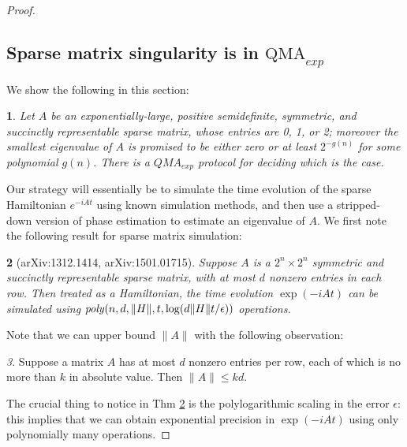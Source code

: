 \documentclass[english]{article}
\numberwithin{equation}{section}
\numberwithin{figure}{section}
\theoremstyle{plain}
\newtheorem{thm}{\protect\theoremname}
\theoremstyle{definition}
\theoremstyle{plain}
\newtheorem{lem}[thm]{\protect\lemmaname}
\theoremstyle{definition}
\theoremstyle{remark}
\newtheorem{rem}[thm]{\protect\remarkname}
\theoremstyle{remark}
\theoremstyle{plain}
\providecommand{\lemmaname}{Lemma}
\providecommand{\remarkname}{Remark}
\providecommand{\theoremname}{Theorem}
\begin{document}
\begin{proof}
\subsection{Sparse matrix singularity is in $\text{QMA}_{exp}$}
We show the following in this section:
\begin{lem}
Let $A$ be an exponentially-large, positive semidefinite, symmetric, and succinctly representable sparse matrix, whose entries are 0, 1, or 2; moreover the smallest eigenvalue of $A$ is promised to be either zero or at least $2^{-g(n)}$ for some polynomial $g(n)$. There is a $QMA_{exp}$ protocol for deciding which is the case.
\end{lem}
Our strategy will essentially be to simulate the time evolution of the sparse Hamiltonian $e^{-iAt}$ using known simulation methods, and then use a stripped-down version of phase estimation to estimate an eigenvalue of $A$. We first note the following result for sparse matrix simulation:
\begin{thm}[arXiv:1312.1414, arXiv:1501.01715] \label{thm:ham_sim}
Suppose $A$ is a $2^n \times 2^n$ symmetric and succinctly representable sparse matrix, with at most $d$ nonzero entries in each row. Then treated as a Hamiltonian, the time evolution $\exp(-iAt)$ can be simulated using $\text{\emph{poly}}(n,d,\|H\|, t, \log(d\|H\|t/\epsilon))$ operations.
\end{thm}
Note that we can upper bound $\|A\|$ with the following observation:
\begin{rem}
Suppose a matrix $A$ has at most $d$ nonzero entries per row, each of which is no more than $k$ in absolute value. Then $\| A \| \le kd$.
\end{rem}
The crucial thing to notice in Thm \ref{thm:ham_sim} is the polylogarithmic scaling in the error $\epsilon$: this implies that we can obtain exponential precision in $\exp(-iAt)$ using only polynomially many operations. 


\end{proof}
\end{document}
